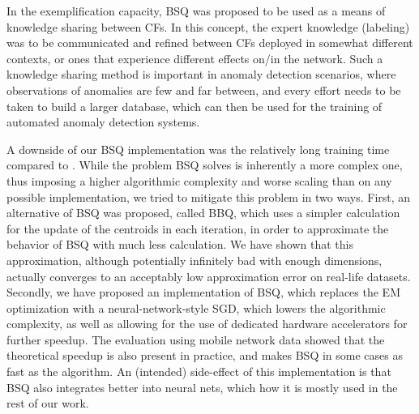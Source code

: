 	In the exemplification capacity, \ac{BSQ} was proposed to be used as a means of knowledge sharing between \acp{CF}.
	In this concept, the expert knowledge (labeling) was to be communicated and refined between \acp{CF} deployed in somewhat different contexts, or ones that experience different effects on/in the network.
	Such a knowledge sharing method is important in anomaly detection scenarios, where observations of anomalies are few and far between, and every effort needs to be taken to build a larger database, which can then be used for the training of automated anomaly detection systems.
	
	A downside of our \ac{BSQ} implementation was the relatively long training time compared to \kmeans{}.
	While the problem \ac{BSQ} solves is inherently a more complex one, thus imposing a higher algorithmic complexity and worse scaling than \kmeans{} on any possible implementation, we tried to mitigate this problem in two ways.
	First, an alternative of \ac{BSQ} was proposed, called \ac{BBQ}, which uses a simpler calculation for the update of the centroids in each iteration, in order to approximate the behavior of \ac{BSQ} with much less calculation.
	We have shown that this approximation, although potentially infinitely bad with enough dimensions, actually converges to an acceptably low approximation error on real-life datasets.
	Secondly, we have proposed an implementation of \ac{BSQ}, which replaces the \ac{EM} optimization with a neural-network-style \ac{SGD}, which lowers the algorithmic complexity, as well as allowing for the use of dedicated hardware accelerators for further speedup.
	The evaluation using mobile network data showed that the theoretical speedup is also present in practice, and makes \ac{BSQ} in some cases as fast as the \kmeans{} algorithm.
	An (intended) side-effect of this implementation is that \ac{BSQ} also integrates better into neural nets, which how it is mostly used in the rest of our work.
	
